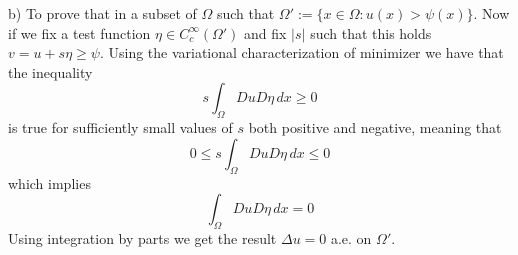 \documentclass{article}
\begin{document}
b) To prove that in a subset of $\Omega$ such that $ \Omega' := \{ x \in \Omega: u(x) > \psi(x) \}$. Now if we fix a test function $ \eta \in C^\infty_c (\Omega')$ and fix $|s|$ such that this holds $v = u + s\eta \geq \psi$. Using the variational characterization of minimizer we have that the inequality
\[
    s \int_\Omega Du D\eta\, dx \geq 0
\]
is true for sufficiently small values of $s$ both positive and negative, meaning that
\[
    0 \leq s \int_\Omega Du D\eta\, dx \leq 0
\]
which implies
\[
    \int_\Omega Du D\eta\, dx = 0
\]
Using integration by parts we get the result $\Delta u = 0$ a.e. on $\Omega '$.
\end{document}

